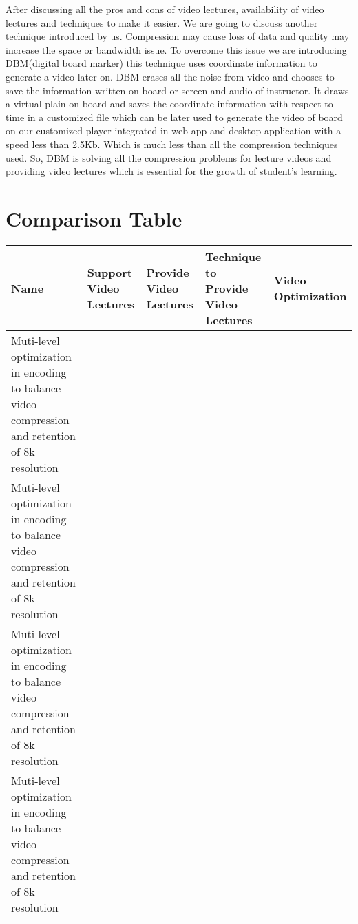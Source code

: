 After discussing all the pros and cons of video lectures, availability of video lectures and techniques to make it easier. We are going to discuss another technique introduced by us. Compression may cause loss of data and quality may increase the space or bandwidth issue. To overcome this issue we are introducing DBM(digital board marker) this technique uses coordinate information to generate a video later on. DBM erases all the noise from video and chooses to save the information written on board or screen and audio of instructor. It draws a virtual plain on board and saves the coordinate information with respect to time in a customized file which can be later used to generate the video of board on our customized player integrated in web app and desktop application with a speed less than 2.5Kb. Which is much less than all the compression techniques used. So, DBM is solving all the compression problems for lecture videos and providing video lectures which is essential for the growth of student's learning.
 

 
\section{Comparison Table}

\begin{sideways}
\centering
\begin{tabularx}{1.5\textwidth} { 
  | >{\raggedright\arraybackslash}X 
  | >{\centering\arraybackslash}X | >{\centering\arraybackslash}X | >{\centering\arraybackslash}X | >{\raggedleft\arraybackslash}X | }
 \hline
\bfseries{Name} & \bfseries{Support Video Lectures} &\bfseries{Provide Video Lectures} &\bfseries{Technique to Provide Video Lectures} & \bfseries{Video Optimization}  \\
\hline
Muti-level optimization in encoding to balance video compression and retention of 8k resolution
&
&
&
&
\\
\hline
Muti-level optimization in encoding to balance video compression and retention of 8k resolution
&
&
&
&
\\
\hline

Muti-level optimization in encoding to balance video compression and retention of 8k resolution
&
&
&
&
\\
\hline

Muti-level optimization in encoding to balance video compression and retention of 8k resolution
&
&
&
&
\\
\hline



\end{tabularx}
\end{sideways}


